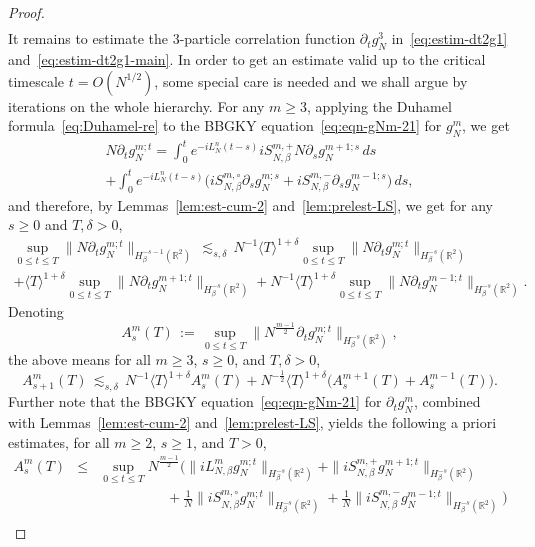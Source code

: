 \documentclass[10pt,a4paper]{amsart}
\newcommand{\R}{\mathbb R}
\begin{document}
\begin{proof}
\begin{multline}
\end{multline}
It remains to estimate the $3$-particle correlation function $\partial_tg_N^3$ in~\eqref{eq:estim-dt2g1} and~\eqref{eq:estim-dt2g1-main}. In order to get an estimate valid up to the critical timescale $t=O(N^{1/2})$, some special care is needed and we shall argue by iterations on the whole hierarchy.
For any $m\ge3$, applying the Duhamel formula~\eqref{eq:Duhamel-re} to the BBGKY equation~\eqref{eq:eqn-gNm-21} for $g_N^m$, we get
\begin{multline*}
N\partial_tg_N^{m;t}=\int_0^te^{-iL_N^n(t-s)}iS_{N,\beta}^{m,+}N\partial_sg_N^{m+1;s}\,ds\\
+\int_0^te^{-iL_N^n(t-s)}\Big(iS_{N,\beta}^{m,\circ}\partial_sg_N^{m;s}+iS_{N,\beta}^{m,-}\partial_sg_N^{m-1;s}\Big)\,ds,
\end{multline*}
and therefore, by Lemmas~\ref{lem:est-cum-2} and~\ref{lem:prelest-LS}, we get for any $s\ge0$ and $T,\delta>0$,
\begin{multline*}
\sup_{0\le t\le T}\|N\partial_tg_N^{m;t}\|_{H^{-s-1}_\beta(\R^2)}\,\lesssim_{s,\delta}\,N^{-1}\langle T\rangle^{1+\delta}\sup_{0\le t\le T}\|N\partial_tg_N^{m;t}\|_{H^{-s}_\beta(\R^2)}\\
+\langle T\rangle^{1+\delta}\sup_{0\le t\le T}\|N\partial_tg_N^{m+1;t}\|_{H^{-s}_\beta(\R^2)}
+N^{-1}\langle T\rangle^{1+\delta}\sup_{0\le t\le T}\|N\partial_tg_N^{m-1;t}\|_{H^{-s}_\beta(\R^2)}.
\end{multline*}
Denoting
\begin{equation}\label{eq:notation-Asm}
A_{s}^m(T)\,:=\,\sup_{0\le t\le T}\|N^{\frac{m-1}2}\partial_tg_N^{m;t}\|_{H^{-s}_\beta(\R^2)},
\end{equation}
the above means for all $m\ge3$, $s\ge0$, and $T,\delta>0$,
\begin{equation}\label{eq:toiterate-Asm}
A_{s+1}^m(T)\,\lesssim_{s,\delta}\,N^{-1}\langle T\rangle^{1+\delta}A_s^m(T)
+N^{-\frac12}\langle T\rangle^{1+\delta}\big(A_s^{m+1}(T)+A_s^{m-1}(T)\big).
\end{equation}
Further note that the BBGKY equation~\eqref{eq:eqn-gNm-21} for $\partial_tg_N^m$, combined with Lemmas~\ref{lem:est-cum-2} and~\ref{lem:prelest-LS}, yields the following a priori estimates, for all $m\ge2$, $s\ge1$, and $T>0$,
\begin{eqnarray}
A_s^m(T)&\le&\sup_{0\le t\le T}N^{\frac{m-1}2}\Big( \|iL_{N,\beta}^mg^{m;t}_N\|_{H^{-s}_\beta(\R^2)}+\|iS_{N,\beta}^{m,+}g_N^{m+1;t}\|_{H^{-s}_\beta(\R^2)}\nonumber\\
&&\hspace{2cm}+\tfrac1N\|iS^{m,\circ}_{N,\beta}g_N^{m;t}\|_{H^{-s}_\beta(\R^2)}+\tfrac1N\|iS_{N,\beta}^{m,-}g_N^{m-1;t}\|_{H^{-s}_\beta(\R^2)}\Big)\nonumber\\

\end{eqnarray}
\end{proof}
\end{document}
